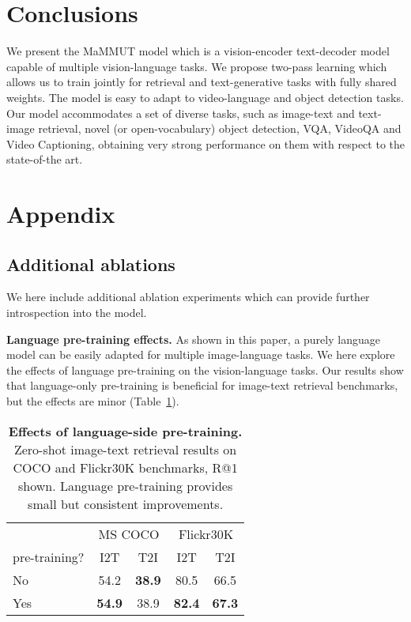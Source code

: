 \documentclass[10pt]{article} \usepackage[accepted]{tmlr}
\newcommand{\tablestyle}[2]{\setlength{\tabcolsep}{#1}\renewcommand{\arraystretch}{#2}\centering\footnotesize}
\newcommand{\ours}{MaMMUT\xspace}
\begin{document}
\section{Conclusions}
\vspace{-1mm}
We present the \ours model which is a vision-encoder text-decoder model capable of multiple vision-language tasks. 
We propose two-pass learning which allows us to train jointly for retrieval and text-generative tasks with fully shared weights. The model is easy to adapt to video-language and object detection tasks.
Our model accommodates a set of diverse tasks, such as image-text and text-image retrieval, novel (or open-vocabulary) object detection, VQA, VideoQA and Video Captioning, obtaining very strong performance on them with respect to the state-of-the art.











\appendix
\section{Appendix}


\subsection{Additional ablations}

We here include additional ablation experiments which can provide further introspection into the model.

\textbf{Language pre-training effects.}
As shown in this paper, a purely language model can be easily adapted for multiple image-language tasks. We here explore the effects of language pre-training on the vision-language tasks. Our results show that language-only pre-training is beneficial for image-text retrieval benchmarks, but the effects are minor (Table~\ref{tab:ablation_pretr}).



\begin{table}[h]
\centering
\small
\tablestyle{8pt}{1.1}
\begin{tabular}{l|cc|cc}
& 
\multicolumn{2}{c|}{MS COCO} & \multicolumn{2}{c}{Flickr30K} \\
 pre-training? & I2T & T2I &I2T &T2I \\ 
\hline
 No  & 54.2    & \bf{38.9}  & 80.5    & 66.5    \\
 Yes  & \bf{54.9}   & 38.9  & \bf{82.4}   & \bf{67.3}   \\
\hline
\end{tabular}
\vspace{2mm}
\caption{\textbf{Effects of language-side pre-training.} Zero-shot image-text retrieval results on COCO and Flickr30K benchmarks, R@1 shown. Language pre-training provides small but consistent improvements.}
\label{tab:ablation_pretr}
\vspace{-2mm}
\end{table}
\end{document}

